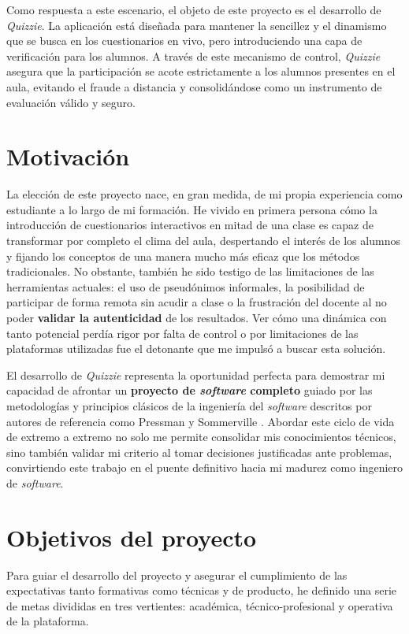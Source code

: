 Como respuesta a este escenario, el objeto de este proyecto es el desarrollo de \textit{Quizzie}. La aplicación está diseñada para mantener la sencillez y el dinamismo que se busca en los cuestionarios en vivo, pero introduciendo una capa de verificación para los alumnos. A través de este mecanismo de control, \textit{Quizzie} asegura que la participación se acote estrictamente a los alumnos presentes en el aula, evitando el fraude a distancia y consolidándose como un instrumento de evaluación válido y seguro.

\section{Motivación}\label{sec:motivacion}
La elección de este proyecto nace, en gran medida, de mi propia experiencia como estudiante a lo largo de mi formación. He vivido en primera persona cómo la introducción de cuestionarios interactivos en mitad de una clase es capaz de transformar por completo el clima del aula, despertando el interés de los alumnos y fijando los conceptos de una manera mucho más eficaz que los métodos tradicionales. No obstante, también he sido testigo de las limitaciones de las herramientas actuales: el uso de pseudónimos informales, la posibilidad de participar de forma remota sin acudir a clase o la frustración del docente al no poder \textbf{validar la autenticidad} de los resultados. Ver cómo una dinámica con tanto potencial perdía rigor por falta de control o por limitaciones de las plataformas utilizadas fue el detonante que me impulsó a buscar esta solución.

El desarrollo de \textit{Quizzie} representa la oportunidad perfecta para demostrar mi capacidad de afrontar un \textbf{proyecto de \textit{software} completo} guiado por las metodologías y principios clásicos de la ingeniería del \textit{software} descritos por autores de referencia como Pressman \cite{pressman2010ingenieria} y Sommerville \cite{sommerville2011ingenieria}. Abordar este ciclo de vida de extremo a extremo no solo me permite consolidar mis conocimientos técnicos, sino también validar mi criterio al tomar decisiones justificadas ante problemas, convirtiendo este trabajo en el puente definitivo hacia mi madurez como ingeniero de \textit{software}.

\section{Objetivos del proyecto}\label{sec:objetivos_del_proyecto}
Para guiar el desarrollo del proyecto y asegurar el cumplimiento de las expectativas tanto formativas como técnicas y de producto, he definido una serie de metas divididas en tres vertientes: académica, técnico-profesional y operativa de la plataforma.
 
